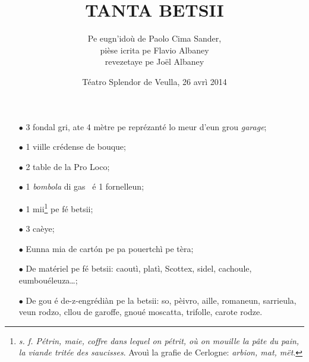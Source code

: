 \title{TANTA BETSII}

\author{Pe eugn'idoù de Paolo Cima Sander,\\ pièse icrita pe Flavio Albaney\\  revezetaye pe Joël Albaney}
\date{Téatro Splendor de Veulla, 26 avrì 2014}

\maketitle







\Scenographie
\begin{itemize}
\item[$\bullet$] 3 fondal gri, ate 4 mètre pe reprézanté lo meur d'eun grou \textit{garage};
\item[$\bullet$] 1 viille crédense de bouque;
\item[$\bullet$] 2 table de la Pro Loco;
\item[$\bullet$] 1 \textit{bombola} di gas \gas\ é 1 fornelleun;
\item[$\bullet$] 1 mii\footnote{ \textit{s. f. Pétrin, maie, coffre dans lequel on pétrit, où on mouille la p\^ate du pain, la viande tritée des saucisses}. Avouì la grafie de Cerlogne: \textit{arbion, mat, m\"et}.} pe fé betsii;
\item[$\bullet$] 3 caèye;
\item[$\bullet$] Eunna mia de cart\'on pe pa pouertchì pe tèra;
\item[$\bullet$] De matériel pe fé betsii: caoutì, platì, Scottex, sidel, cachoule, eumbouéleuza\ldots ;
\item[$\bullet$] De gou é de-z-engrédiàn pe la betsii: so, pèivro, aille, romaneun,  sarrieula, veun rodzo, cllou de garoffe, gnoué moscatta, trifolle, carote rodze.
\end{itemize}

\setlength{\lengthchar}{2.5 cm}


